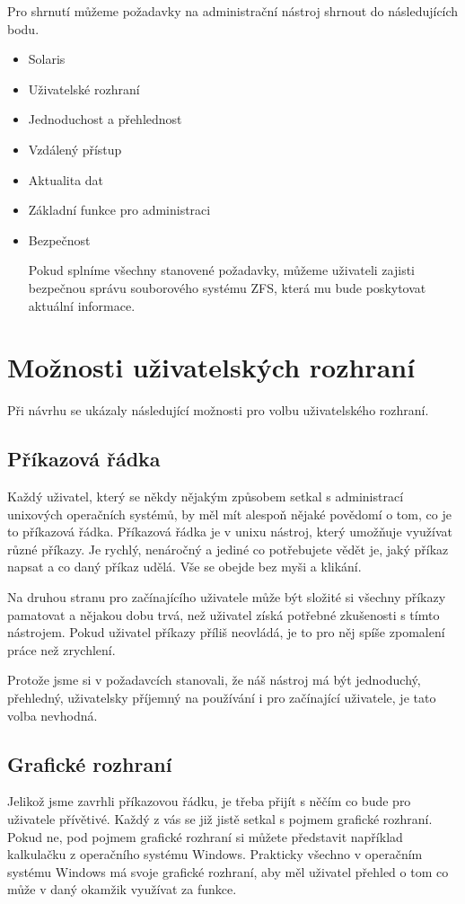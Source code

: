 Pro shrnutí můžeme požadavky na administrační nástroj shrnout do následujících bodu.
\begin{itemize}
    \item Solaris
    \item Uživatelské rozhraní
    \item Jednoduchost a přehlednost
    \item Vzdálený přístup
    \item Aktualita dat
    \item Základní funkce pro administraci
    \item Bezpečnost

Pokud splníme všechny stanovené požadavky, můžeme uživateli zajisti bezpečnou správu souborového systému ZFS, která mu bude poskytovat aktuální informace.
\end{itemize}
\section{Možnosti uživatelských rozhraní}
Při návrhu se ukázaly následující možnosti pro volbu uživatelského rozhraní.
    \subsection{Příkazová řádka}
    Každý uživatel, který se někdy nějakým způsobem setkal s administrací unixových operačních systémů, by měl mít alespoň nějaké povědomí o tom, co je to příkazová řádka. Příkazová řádka je v unixu nástroj, který umožňuje využívat různé příkazy. Je rychlý, nenáročný a jediné co potřebujete vědět je, jaký příkaz napsat a co daný příkaz udělá. Vše se obejde bez myši a klikání.

    Na druhou stranu pro začínajícího uživatele může být složité si všechny příkazy pamatovat a nějakou dobu trvá, než uživatel získá potřebné zkušenosti s tímto nástrojem. Pokud uživatel příkazy příliš neovládá, je to pro něj spíše zpomalení práce než zrychlení.

    Protože jsme si v požadavcích stanovali, že náš nástroj má být jednoduchý, přehledný, uživatelsky příjemný na používání i pro začínající uživatele, je tato volba nevhodná.
    \subsection{Grafické rozhraní}
    Jelikož jsme zavrhli příkazovou řádku, je třeba přijít s něčím co bude pro uživatele přívětivé. Každý z vás se již jistě setkal s pojmem grafické rozhraní. Pokud ne, pod pojmem grafické rozhraní si můžete představit například kalkulačku z operačního systému Windows. Prakticky všechno v operačním systému Windows má svoje grafické rozhraní, aby měl uživatel přehled o tom co může v daný okamžik využívat za funkce.

